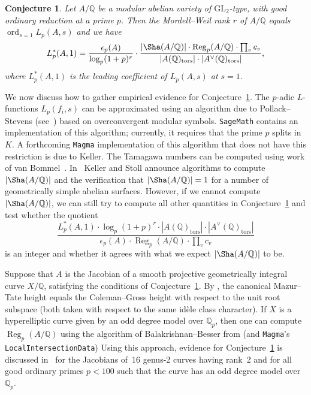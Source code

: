 \documentclass[11pt, a4paper]{amsart}
\newcommand{\Q}{\mathbb{Q}}
\newcommand{\tors}{\operatorname{tors}}
\newcommand{\Reg}{\operatorname{Reg}}
\newcommand{\ord}{\operatorname{ord}}
\newtheorem{conj}[theorem]{Conjecture}
\theoremstyle{remark}
\numberwithin{equation}{section}
\begin{document}
\begin{conj}\label{pbsd}
Let $A/\Q$ be a modular abelian variety of  $\mathrm{GL}_2$-type, with
good ordinary reduction at a prime $p$.
Then the Mordell--Weil rank $r$ of $A/\Q$ equals
      $\ord_{s=1}L_p(A,s)$ and we have
      \begin{equation*}\label{eq-pbsd}{L}_p^*(A,1)
        =\frac{\epsilon_p(A)}{\log_p(1+p)^r}
\cdot\frac{ |\Sha(A/\Q)|
      \cdot \Reg_{p}(A/\Q) \cdot \prod_v  c_v
}{|A(\Q)_{\tors}|\cdot|A^{\vee}(\Q)_{\tors}|},\end{equation*} where
  $L_p^*(A,1)$
is the leading coefficient of $L_p(A,s)$ at $s=1$. \end{conj}

We now discuss how to gather empirical evidence for Conjecture~\ref{pbsd}. The $p$-adic
$L$-functions $L_p(f_i,s)$ can be approximated using an algorithm due to
Pollack--Stevens (see~\cite{PS11}) based on overconvergent modular
symbols. 
{\tt SageMath} contains an implementation of this algorithm;
currently, it requires that the prime $p$ splits in $K$. 
A forthcoming {\tt Magma}
implementation of this algorithm that does not have this restriction is due
to Keller.
The Tamagawa numbers can be computed using work of van Bommel~\cite{vB22}.
 In~\cite{KS22, KS} Keller and Stoll announce algorithms to compute
 $|\Sha(A/\Q)|$ and the verification that $|\Sha(A/\Q)|=1$ for a
 number of geometrically simple abelian surfaces.
However, if we cannot compute $|\Sha(A/\Q)|$, we can still
try to compute all other quantities in Conjecture~\ref{pbsd}
and test whether the quotient
\begin{equation*}\label{}
  \frac{{L}_p^*(A,1)\cdot \log_p(1+p)^r\cdot |A(\Q)_{\tors}|\cdot|A^{\vee}(\Q)_{\tors}|}
{\epsilon_p(A)
      \cdot \Reg_{p}(A/\Q) \cdot \prod_v  c_v
}
\end{equation*}
is an integer and whether it agrees with what we expect $|\Sha(A/\Q)|$ to
be.

Suppose that $A$ is the Jacobian of a smooth projective geometrically
integral curve $X/\Q$, satisfying the
conditions of Conjecture~\ref{pbsd}.
By \cite[Theorem 3.3.1]{Coleman-bi-extension-p-adic-heights}, the
canonical Mazur--Tate height equals the Coleman--Gross height with respect
to the unit root subspace (both taken with respect to the same idèle
class character).
If $X$ is a hyperelliptic curve given by an odd degree model over $\Q_p$,
then one can compute $\Reg_p(A/\Q)$ using the algorithm of
Balakrishnan--Besser from \cite{BBHeights} (and {\tt Magma}'s {\tt
LocalIntersectionData})
Using this approach, evidence for Conjecture~\ref{pbsd} is discussed
in~\cite[Section~4]{BMS16} for the Jacobians of~16 genus-2 curves having
rank~2 and for all good ordinary primes $p<100$ such that the curve has an odd degree model
over $\Q_p$.
\end{document}
